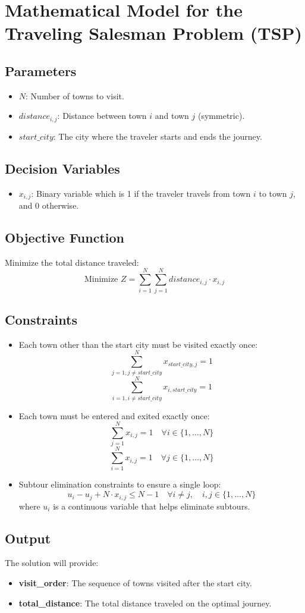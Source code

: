 \documentclass{article}
\begin{document}
\section*{Mathematical Model for the Traveling Salesman Problem (TSP)}

\subsection*{Parameters}
\begin{itemize}
    \item $N$: Number of towns to visit.
    \item $distance_{i,j}$: Distance between town $i$ and town $j$ (symmetric).
    \item $start\_city$: The city where the traveler starts and ends the journey.
\end{itemize}

\subsection*{Decision Variables}
\begin{itemize}
    \item $x_{i,j}$: Binary variable which is 1 if the traveler travels from town $i$ to town $j$, and 0 otherwise.
\end{itemize}

\subsection*{Objective Function}
Minimize the total distance traveled:
\[
\text{Minimize } Z = \sum_{i=1}^{N} \sum_{j=1}^{N} distance_{i,j} \cdot x_{i,j}
\]

\subsection*{Constraints}
\begin{itemize}
    \item Each town other than the start city must be visited exactly once:
    \[
    \sum_{j=1, j \neq start\_city}^{N} x_{start\_city,j} = 1
    \]
    \[
    \sum_{i=1, i \neq start\_city}^{N} x_{i,start\_city} = 1
    \]
    
    \item Each town must be entered and exited exactly once:
    \[
    \sum_{j=1}^{N} x_{i,j} = 1 \quad \forall i \in \{1, \ldots, N\}
    \]
    \[
    \sum_{i=1}^{N} x_{i,j} = 1 \quad \forall j \in \{1, \ldots, N\}
    \]
    
    \item Subtour elimination constraints to ensure a single loop:
    \[
    u_i - u_j + N \cdot x_{i,j} \leq N - 1 \quad \forall i \neq j, \quad i,j \in \{1, \ldots, N\}
    \]
    where $u_i$ is a continuous variable that helps eliminate subtours.
\end{itemize}

\subsection*{Output}
The solution will provide:
\begin{itemize}
    \item \textbf{visit\_order}: The sequence of towns visited after the start city.
    \item \textbf{total\_distance}: The total distance traveled on the optimal journey.
\end{itemize}
\end{document}
